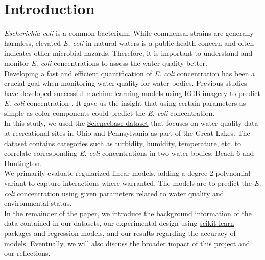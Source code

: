 
\section{Introduction}
\label{sec:intro}

\textit{Escherichia coli} is a common bacterium. While commensal strains are generally harmless, elevated \textit{E. coli} in natural waters is a public health concern and often indicates other microbial hazards. Therefore, it is important to understand and monitor \textit{E. coli} concentrations to assess the water quality better.\\
Developing a fast and efficient quantification of \textit{E. coli} concentration has been a crucial goal when monitoring water quality for water bodies. Previous studies have developed successful machine learning models using RGB imagery to predict \textit{E. coli} concentration \cite{Hong}. It gave us the insight that using certain parameters as simple as color components could predict the \textit{E. coli} concentration.\\
In this study, we used the \href{https://www.sciencebase.gov/catalog/item/6100b22dd34ef8d7055d02ee}{Sciencebase dataset} that focuses on water quality data at recreational sites in Ohio and Pennsylvania as part of the Great Lakes. The dataset contains categories such as turbidity, humidity, temperature, etc. to correlate corresponding \textit{E. coli} concentrations in two water bodies: Beach 6 and Huntington.\\
We primarily evaluate regularized linear models, adding a degree-2 polynomial variant to capture interactions where warranted. The models are to predict the \textit{E. coli} concentration using given parameters related to water quality and environmental status.\\
In the remainder of the paper, we introduce the background information of the data contained in our datasets, our experimental design using \href{https://scikit-learn.org/stable}{scikit-learn} packages and regression models, and our results regarding the accuracy of models. Eventually, we will also discuss the broader impact of this project and our reflections. 




